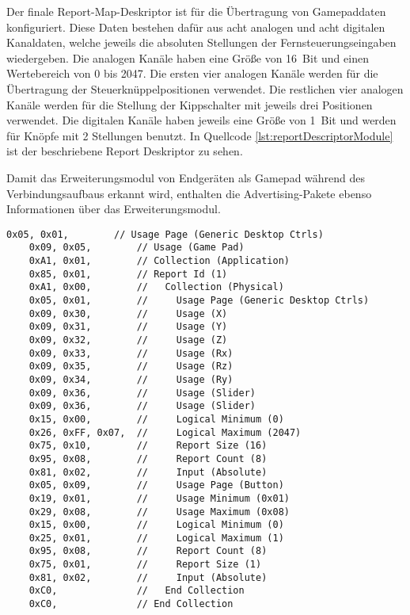 Der finale Report-Map-Deskriptor ist für die Übertragung von Gamepaddaten konfiguriert. Diese Daten bestehen dafür aus acht analogen und acht digitalen Kanaldaten, welche jeweils die absoluten Stellungen der Fernsteuerungseingaben wiedergeben. Die analogen Kanäle haben eine Größe von 16~Bit und einen Wertebereich von 0 bis 2047. Die ersten vier analogen Kanäle werden für die Übertragung der Steuerknüppelpositionen verwendet. Die restlichen vier analogen Kanäle werden für die Stellung der Kippschalter mit jeweils drei Positionen verwendet. Die digitalen Kanäle haben jeweils eine Größe von 1~Bit und werden für Knöpfe mit 2 Stellungen benutzt. In Quellcode \ref{lst:reportDescriptorModule} ist der beschriebene Report Deskriptor zu sehen.

Damit das Erweiterungsmodul von Endgeräten als Gamepad während des Verbindungsaufbaus erkannt wird, enthalten die Advertising-Pakete ebenso Informationen über das Erweiterungsmodul.

\begin{lstlisting}[caption=Report Map Deskriptor des Erweiterungsmoduls, label={lst:reportDescriptorModule}, style=generalStyle]
    0x05, 0x01,        // Usage Page (Generic Desktop Ctrls)
    0x09, 0x05,        // Usage (Game Pad)
    0xA1, 0x01,        // Collection (Application)
    0x85, 0x01,        // Report Id (1)
    0xA1, 0x00,        //   Collection (Physical)
    0x05, 0x01,        //     Usage Page (Generic Desktop Ctrls)
    0x09, 0x30,        //     Usage (X)
    0x09, 0x31,        //     Usage (Y)
    0x09, 0x32,        //     Usage (Z)
    0x09, 0x33,        //     Usage (Rx)
    0x09, 0x35,        //     Usage (Rz)
    0x09, 0x34,        //     Usage (Ry)
    0x09, 0x36,        //     Usage (Slider)
    0x09, 0x36,        //     Usage (Slider)
    0x15, 0x00,        //     Logical Minimum (0)
    0x26, 0xFF, 0x07,  //     Logical Maximum (2047)
    0x75, 0x10,        //     Report Size (16)
    0x95, 0x08,        //     Report Count (8)
    0x81, 0x02,        //     Input (Absolute)
    0x05, 0x09,        //     Usage Page (Button)
    0x19, 0x01,        //     Usage Minimum (0x01)
    0x29, 0x08,        //     Usage Maximum (0x08)
    0x15, 0x00,        //     Logical Minimum (0)
    0x25, 0x01,        //     Logical Maximum (1)
    0x95, 0x08,        //     Report Count (8)
    0x75, 0x01,        //     Report Size (1)
    0x81, 0x02,        //     Input (Absolute)
    0xC0,              //   End Collection
    0xC0,              // End Collection
\end{lstlisting}

